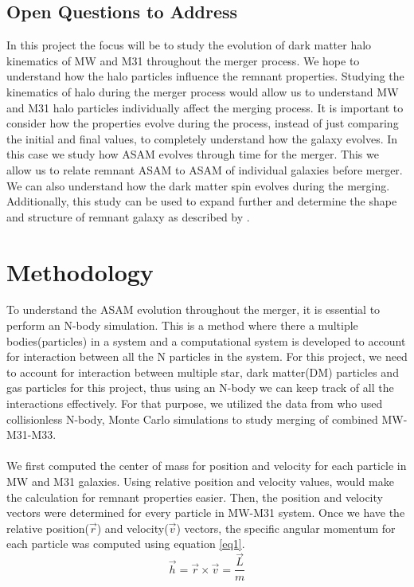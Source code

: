 \documentclass[twocolumn]{aastex631}
\begin{document}
\subsection{Open Questions to Address}
In this project the focus will be to study the evolution of dark matter halo kinematics of MW and M31 throughout the merger process. We hope to understand how the halo particles influence the remnant properties. Studying the kinematics of halo during the merger process would allow us to understand MW and M31 halo particles individually affect the merging process. 
It is important to consider how the properties evolve during the process, instead of just comparing the initial and final values, to completely understand how the galaxy evolves. In this case we study how ASAM evolves through time for the merger. This we allow us to relate remnant ASAM to ASAM of individual galaxies before merger. We can also understand how the dark matter spin evolves during the merging. Additionally, this study can be used to expand further and determine the shape and structure of remnant galaxy as described by \citet{Teklu2015}.

\section{Methodology} \label{sec:method}
To understand the ASAM evolution throughout the merger, it is essential to perform an N-body simulation. This is a method where there a multiple bodies(particles) in a system and a computational system is developed to account for interaction between all the N particles in the system. For this project, we need to account for interaction between multiple star, dark matter(DM) particles and gas particles for this project, thus using an N-body we can keep track of all the interactions effectively. For that purpose, we utilized the data from \citet{Van2012} who used collisionless N-body, Monte Carlo simulations to study merging of combined MW-M31-M33.  
\\\\
We first computed the center of mass for position and velocity for each particle in MW and M31 galaxies. Using relative position and velocity values, would make the calculation for remnant properties easier. Then, the position and velocity vectors were determined for every particle in MW-M31 system. Once we have the relative position($\vec{r}$) and velocity($\vec{v}$) vectors, the specific angular momentum for each particle was computed using equation \ref{eq1}.
\begin{equation} \label{eq1}
\vec{h} = \vec{r} \times \vec{v} = \frac{\vec{L}}{m}
\end{equation}
\end{document}
